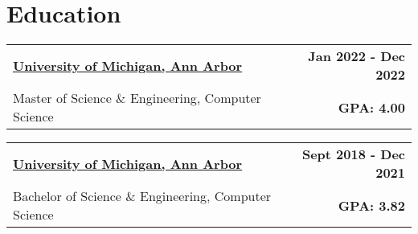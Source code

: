 \documentclass[11pt]{extreport}
\makeatletter
\newcommand{\resumeSubheading}[4]{
  \vspace{-1pt}
    \begin{tabular*}{1.0\textwidth}{l@{\extracolsep{\fill}}r}
      \textbf{#1} & \textbf{#2}  \vspace{1mm} \\
      {#3} & \textbf{#4} \\
    \end{tabular*}\vspace{-3pt}
}
\makeatother
\begin{document}
\vspace{-1.5mm}

\section{Education}
        \resumeSubheading{\underline{University of Michigan, Ann Arbor}} {Jan 2022 - Dec 2022}
      {Master of Science \& Engineering, Computer Science}{ GPA: 4.00}
     
      \vspace{2mm}
    \resumeSubheading{\underline{University of Michigan, Ann Arbor}}{Sept 2018 - Dec 2021}
      {Bachelor of Science \& Engineering, Computer Science}{GPA: 3.82}
    \vspace{-1mm}

\vspace{-1.5mm}
\vspace{-5pt}
\end{document}
